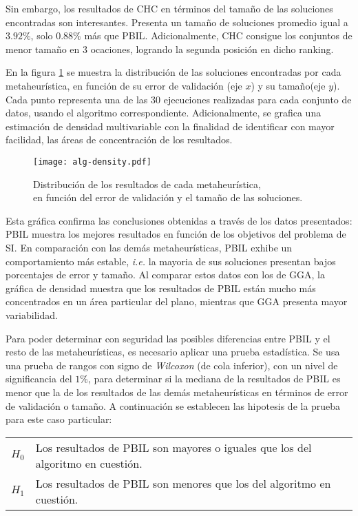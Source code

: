 Sin embargo, los resultados de CHC en términos del tamaño de las soluciones encontradas son interesantes. Presenta un tamaño de soluciones promedio igual a $3.92\%$, solo $0.88\%$ más que PBIL. Adicionalmente, CHC consigue los conjuntos de menor tamaño en 3 ocaciones, logrando la segunda posición en dicho ranking.

En la figura \ref{fig-alg-density} se muestra la distribución de las soluciones encontradas por cada metaheurística, en función de su error de validación (eje $x$) y su tamaño\linebreak(eje $y$). Cada punto representa una de las 30 ejecuciones realizadas para cada conjunto de datos, usando el algoritmo correspondiente. Adicionalmente, se grafica una estimación de densidad multivariable con la finalidad de identificar con mayor facilidad, las áreas de concentración de los resultados.

\begin{figure}[h!]
\centering
\texttt{[image: alg-density.pdf]}
\caption[Distribución de los resultados de cada metaheurística]{Distribución de los resultados de cada metaheurística,\\en función del error de validación y el tamaño de las soluciones.}
\label{fig-alg-density}
\end{figure}

Esta gráfica confirma las conclusiones obtenidas a través de los datos presentados: PBIL muestra los mejores resultados en función de los objetivos del problema de SI. En comparación con las demás metaheurísticas, PBIL exhibe un comportamiento más estable, \emph{i.e.} la mayoria de sus soluciones presentan bajos porcentajes de error y tamaño. Al comparar estos datos con los de GGA, la gráfica de densidad muestra que los resultados de PBIL están mucho más concentrados en un área particular del plano, mientras que GGA presenta mayor variabilidad.

Para poder determinar con seguridad las posibles diferencias entre PBIL y el resto de las metaheurísticas, es necesario aplicar una prueba estadística. Se usa una prueba de rangos con signo de \emph{Wilcoxon} \cite{wilcoxon1945individual} (de cola inferior), con un nivel de significancia del $1\%$, para determinar si la mediana de la resultados de PBIL es menor que la de los resultados de las demás metaheurísticas en términos de error de validación o tamaño. A continuación se establecen las hipotesis de la prueba para este caso particular:

\begin{tabular}{l l}
$H_0$ & Los resultados de PBIL son mayores o iguales que los del algoritmo en cuestión.\\
$H_1$ & Los resultados de PBIL son menores que los del algoritmo en cuestión.\\
\end{tabular}

